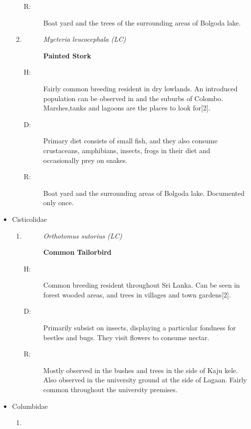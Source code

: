 \begin{itemize}
\begin{enumerate}
\begin{description}
\item[R: ]%
Boat yard and the trees of the surrounding areas of Bolgoda lake.%
\end{description}%
\item%
\begin{description}%
\item[]%
\textit{Mycteria leucocephala (LC)}%
\item[]%
\textbf{Painted Stork}%
\end{description}%
\begin{description}%
\item[H: ]%
Fairly common breeding resident in dry lowlands. An introduced population can be observed in and the suburbs of Colombo. Marshes,tanks and lagoons are the places to look for{[}2{]}.%
\item[D: ]%
Primary diet consists of small fish, and they also consume crustaceans, amphibians, insects, frogs in their diet and occasionally prey on snakes.%
\item[R: ]%
Boat yard and the surrounding areas of Bolgoda lake. Documented only once.%
\end{description}%
\end{enumerate}%
\item%
Cisticolidae%
\begin{enumerate}%
\item%
\begin{description}%
\item[]%
\textit{Orthotomus sutorius (LC)}%
\item[]%
\textbf{Common Tailorbird}%
\end{description}%
\begin{description}%
\item[H: ]%
Common breeding resident throughout Sri Lanka. Can be seen in forest wooded areas, and trees in villages and town gardens{[}2{]}.%
\item[D: ]%
Primarily subsist on insects, displaying a particular fondness for beetles and bugs. They visit flowers to consume nectar.%
\item[R: ]%
Mostly observed in the bushes and trees in the side of Kaju kele. Also observed in the university ground at the side of Lagaan. Fairly common throughout the university premises.%
\end{description}%
\end{enumerate}%
\item%
Columbidae%
\begin{enumerate}%
\item%

\end{enumerate}
\end{itemize}
